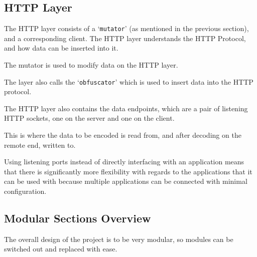 \subsection{HTTP Layer}
The HTTP layer consists of a `\texttt{mutator}' (as mentioned in the previous section), and a corresponding client. The HTTP layer understands the HTTP Protocol, and how data can be inserted into it.\par
The mutator is used to modify data on the HTTP layer.\par
The layer also calls the `\texttt{obfuscator}' which is used to insert data into the HTTP protocol.\par
The HTTP layer also contains the data endpoints, which are a pair of listening HTTP sockets, one on the server and one on the client.\par
This is where the data to be encoded is read from, and after decoding on the remote end, written to.
\begin{center}
\end{center}
Using listening ports instead of directly interfacing with an application means that there is significantly more flexibility with regards to the applications that it can be used with because multiple applications can be connected with minimal configuration.

\subsection{Modular Sections Overview}
The overall design of the project is to be very modular, so modules can be switched out and replaced with ease.

